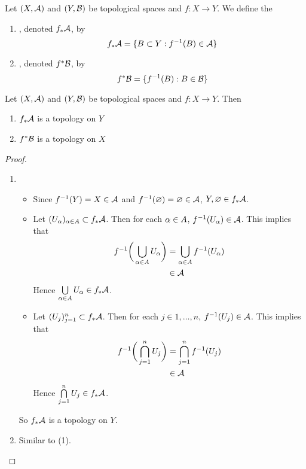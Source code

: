\documentclass{book}
\begin{document}
	\begin{defn} 
	Let $(X, \mathcal{A})$ and $(Y,\mathcal{B})$ be topological spaces and $f: X \rightarrow Y$. We define the 
	\begin{enumerate}
	\item {}, denoted $f_*\mathcal{A}$, by 
	$$f_*\mathcal{A} = \{B \subset Y: f^{-1}(B) \in \mathcal{A}\}$$ 
	\item  {}, denoted $f^*\mathcal{B}$, by  
	$$f^*\mathcal{B} = \{f^{-1}(B):  B \in \mathcal{B} \}$$
	\end{enumerate}
	\end{defn}
	
	\begin{ex} 
		Let $(X,\mathcal{A})$ and $(Y,\mathcal{B})$ be topological spaces and $f: X \rightarrow Y$. Then 
		\begin{enumerate}
			\item $f_*\mathcal{A}$ is a topology on $Y$
			\item $f^*\mathcal{B}$ is a topology on $X$
		\end{enumerate}
	\end{ex}
	
	\begin{proof}\
		\begin{enumerate}
			\item 
			\begin{itemize}
			\item Since $f^{-1}(Y) = X \in \mathcal{A}$ and $f^{-1}(\varnothing) = \varnothing \in \mathcal{A}$, $Y, \varnothing \in f_*\mathcal{A}$.
			\item Let $(U_{\alpha})_{\alpha \in A} \subset f_*\mathcal{A}$. Then for each $\alpha \in A$, $f^{-1}(U_{\alpha}) \in \mathcal{A}$. This implies that 
			\begin{align*}
			f^{-1}\bigg( \bigcup\limits_{\alpha \in A}U_{\alpha} \bigg) 
			&=  \bigcup\limits_{\alpha \in A} f^{-1}(U_{\alpha}) \\
			& \in \mathcal{A}
			\end{align*}
			Hence $\bigcup\limits_{\alpha \in A}U_{\alpha} \in f_*\mathcal{A}$.
			\item Let $(U_{j})_{j=1}^n \subset f_*\mathcal{A}$. Then for each $j \in {1, \ldots, n}$, $f^{-1}(U_{j}) \in \mathcal{A}$. This implies that 
			\begin{align*}
			f^{-1}\bigg( \bigcap\limits_{j=1}^n U_{j} \bigg) 
			&=  \bigcap\limits_{j=1}^n f^{-1}(U_{j}) \\
			& \in \mathcal{A}
			\end{align*}
			Hence $\bigcap\limits_{j=1}^n U_{j} \in f_*\mathcal{A}$.
			\end{itemize}
			So $f_*\mathcal{A}$ is a topology on $Y$.
			\item Similar to (1).
		\end{enumerate}
	\end{proof}	
	
\end{document}
